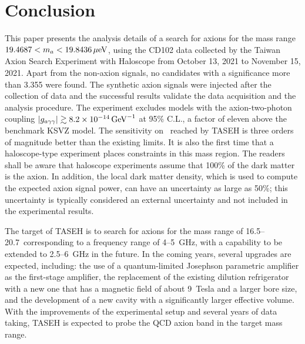 \section{Conclusion} \label{sec:conclusion}
This paper presents the analysis details of a search for axions for the mass 
range $19.4687 < m_a < 19.8436 \,\mu\text{e\hspace{-.08em}V}$, using the CD102 data collected by the 
Taiwan Axion Search Experiment with Haloscope from October 13, 2021 
to November 15, 2021. 
Apart from the non-axion signals, no candidates with a significance more than
3.355 were found. The synthetic 
axion signals were injected after the collection of data and the 
successful results validate the data acquisition and the analysis procedure. 
The experiment excludes models with the 
axion-two-photon coupling $\left|g_{a\gamma\gamma}\right|\gtrsim 8.2\times 10^{-14}\,\text{Ge\hspace{-.08em}V}^{-1}$ at 95\% C.L.,
 a factor of eleven 
above the benchmark KSVZ model. The sensitivity on \gagg\ reached by TASEH 
is three orders of magnitude better than the existing limits. 
It is also the first time that a haloscope-type experiment places 
constraints in this mass region. The readers shall be aware that haloscope 
experiments assume 
that 100\% of the dark matter is the axion. In addition, the local dark 
matter density, which is used to compute the expected axion signal power, 
can have an uncertainty as large as 50\%; this uncertainty 
is typically considered an external 
uncertainty and not included in the experimental results. 

The target of TASEH is to search for axions for the mass range of 
16.5--20.7\muevcc\ corresponding to a frequency range of 4--5~GHz, with a 
capability to be extended to 2.5--6~GHz in the future. 
In the coming years, several upgrades are expected, including: the use of a 
quantum-limited Josephson parametric amplifier as the first-stage amplifier, 
the replacement of the existing dilution refrigerator with a new one that has 
a magnetic field of about 9~Tesla and a larger bore size, and the development 
of a new cavity with a significantly larger effective volume. %
With the improvements of the experimental setup and several years of data 
taking, TASEH is expected to probe the QCD axion band in the target mass range.


